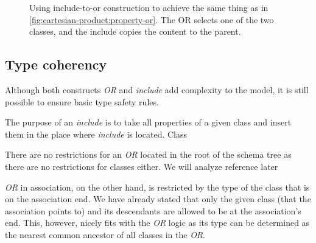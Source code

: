 \begin{figure}[h!]\centering
  \centering
  \caption{Using include-to-or construction to achieve the same thing as in \autoref{fig:cartesian-product:property-or}. The OR selects one of the two classes, and the include copies the content to the parent.}
\end{figure}

\subsection{Type coherency}\label{sec:type-coherency}


Although both constructs \textit{OR} and \textit{include} add complexity to the model, it is still possible to ensure basic type safety rules.

The purpose of an \textit{include} is to take all properties of a given class and insert them in the place where \textit{include} is located. Class


There are no restrictions for an \textit{OR} located in the root of the schema tree as there are no restrictions for classes either. We will analyze reference later

\textit{OR} in association, on the other hand, is restricted by the type of the class that is on the association end. We have already stated that only the given class (that the association points to) and its descendants are allowed to be at the association's end. This, however, nicely fits with the \textit{OR} logic as its type can be determined as the nearest common ancestor of all classes in the \textit{OR}.

